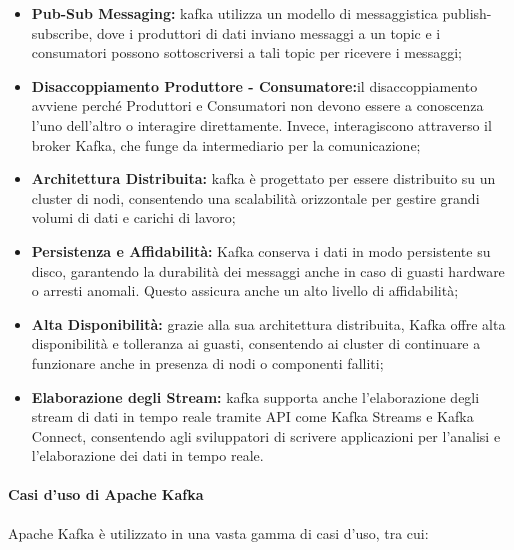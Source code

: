 \begin{itemize}
  \item \textbf{Pub-Sub Messaging:} kafka utilizza un modello di messaggistica publish-subscribe, dove i produttori di dati inviano messaggi a un topic e i consumatori possono sottoscriversi a tali topic per ricevere i messaggi;
  \item \textbf{Disaccoppiamento Produttore - Consumatore:}il disaccoppiamento avviene perché Produttori e Consumatori non devono essere a conoscenza l'uno dell'altro o interagire direttamente. Invece, interagiscono attraverso il broker Kafka, che funge da intermediario per la comunicazione;
  \item \textbf{Architettura Distribuita:} kafka è progettato per essere distribuito su un cluster di nodi, consentendo una scalabilità orizzontale per gestire grandi volumi di dati e carichi di lavoro;
  
  \item \textbf{Persistenza e Affidabilità:} Kafka conserva i dati in modo persistente su disco, garantendo la durabilità dei messaggi anche in caso di guasti hardware o arresti anomali. Questo assicura anche un alto livello di affidabilità;
  
  \item \textbf{Alta Disponibilità:} grazie alla sua architettura distribuita, Kafka offre alta disponibilità e tolleranza ai guasti, consentendo ai cluster di continuare a funzionare anche in presenza di nodi o componenti falliti;
  
  \item \textbf{Elaborazione degli Stream:} kafka supporta anche l'elaborazione degli stream di dati in tempo reale tramite API come Kafka Streams e Kafka Connect, consentendo agli sviluppatori di scrivere applicazioni per l'analisi e l'elaborazione dei dati in tempo reale.
\end{itemize}

\paragraph{Casi d'uso di Apache Kafka}

Apache Kafka è utilizzato in una vasta gamma di casi d'uso, tra cui:

